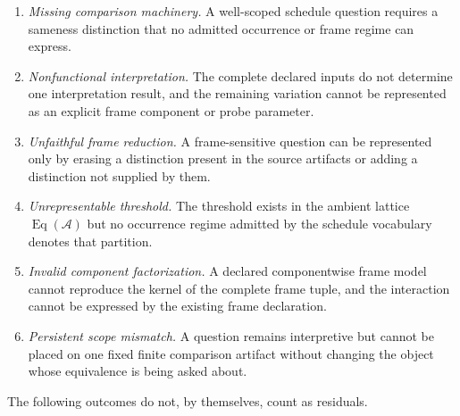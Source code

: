 \documentclass[11pt]{article}
\theoremstyle{plain}
\theoremstyle{definition}
\theoremstyle{remark}
\begin{document}
\begin{enumerate}[label=(R\arabic*)]
  \item \emph{Missing comparison machinery.}
        A well-scoped schedule question
        requires a sameness distinction
        that no admitted occurrence
        or frame regime can express.

  \item \emph{Nonfunctional interpretation.}
        The complete declared inputs
        do not determine one interpretation result,
        and the remaining variation
        cannot be represented
        as an explicit frame component
        or probe parameter.

  \item \emph{Unfaithful frame reduction.}
        A frame-sensitive question
        can be represented only by
        erasing a distinction present
        in the source artifacts
        or adding a distinction
        not supplied by them.

  \item \emph{Unrepresentable threshold.}
        The threshold exists
        in the ambient lattice
        \(\operatorname{Eq}(\mathcal{A})\)
        but no occurrence regime
        admitted by the schedule vocabulary
        denotes that partition.

  \item \emph{Invalid component factorization.}
        A declared componentwise frame model
        cannot reproduce the kernel
        of the complete frame tuple,
        and the interaction cannot be expressed
        by the existing frame declaration.

  \item \emph{Persistent scope mismatch.}
        A question remains interpretive
        but cannot be placed
        on one fixed finite comparison artifact
        without changing the object
        whose equivalence is being asked about.
\end{enumerate}

The following outcomes do not,
by themselves,
count as residuals.
\end{document}
